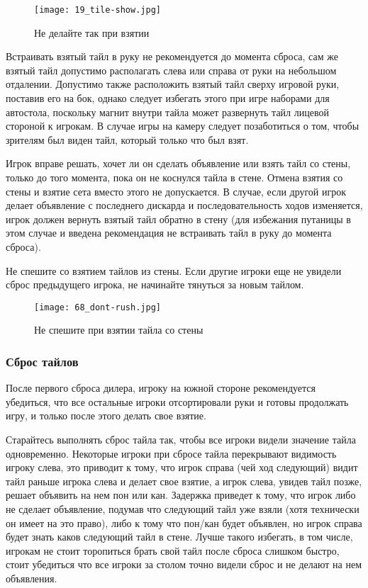 \begin{figure}[H]
	\centering
	\texttt{[image: 19\_tile-show.jpg]}
	\caption{Не делайте так при взятии}
\end{figure}

Встраивать взятый тайл в руку не рекомендуется до момента сброса, сам же взятый тайл допустимо располагать слева или справа от руки на небольшом отдалении. Допустимо также расположить взятый тайл сверху игровой руки, поставив его на бок, однако следует избегать этого при игре наборами для автостола, поскольку магнит внутри тайла может развернуть тайл лицевой стороной к игрокам. В случае игры на камеру следует позаботиться о том, чтобы зрителям был виден тайл, который только что был взят.

Игрок вправе решать, хочет ли он сделать объявление или взять тайл со стены, только до того момента, пока он не коснулся тайла в стене. Отмена взятия со стены и взятие сета вместо этого не допускается. В случае, если другой игрок делает объявление с последнего дискарда и последовательность ходов изменяется, игрок должен вернуть взятый тайл обратно в стену (для избежания путаницы в этом случае и введена рекомендация не встраивать тайл в руку до момента сброса).

Не спешите со взятием тайлов из стены. Если другие игроки еще не увидели сброс предыдущего игрока, не начинайте тянуться за новым тайлом.

\begin{figure}[H]
	\centering
	\texttt{[image: 68\_dont-rush.jpg]}
	\caption{Не спешите при взятии тайла со стены}
\end{figure}

\subsubsection{Сброс тайлов}

После первого сброса дилера, игроку на южной стороне рекомендуется убедиться, что все остальные игроки отсортировали руки и готовы продолжать игру, и только после этого делать свое взятие.

Старайтесь выполнять сброс тайла так, чтобы все игроки видели значение тайла одновременно. Некоторые игроки при сбросе тайла перекрывают видимость игроку слева, это приводит к тому, что игрок справа (чей ход следующий) видит тайл раньше игрока слева и делает свое взятие, а игрок слева, увидев тайл позже, решает объявить на нем пон или кан. Задержка приведет к тому, что игрок либо не сделает объявление, подумав что следующий тайл уже взяли (хотя технически он имеет на это право), либо к тому что пон/кан будет объявлен, но игрок справа будет знать каков следующий тайл в стене. Лучше такого избегать, в том числе, игрокам не стоит торопиться брать свой тайл после сброса слишком быстро, стоит убедиться что все игроки за столом точно видели сброс и не делают на нем объявления.


